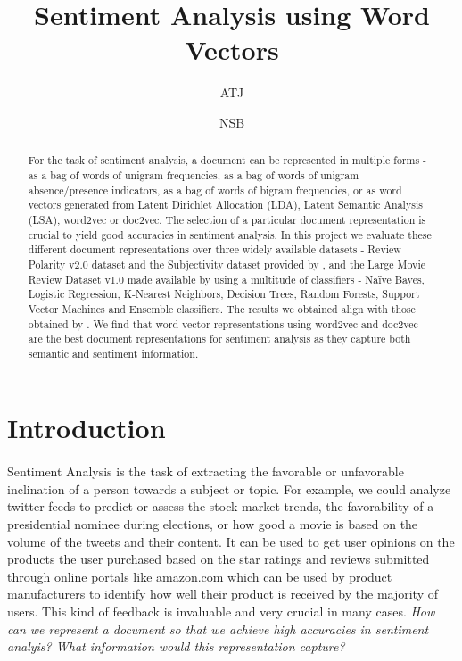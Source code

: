 \documentclass[11pt, oneside]{article}
\title{Sentiment Analysis using Word Vectors}
\author{ATJ}
\author{NSB}
\affil{University of Massachussets, Amherst}
\date{}
\begin{document}
\maketitle
{}
\newpage
{}
\begin{abstract}
For the task of sentiment analysis, a document can be represented in multiple forms - as a bag of words of unigram frequencies, as a bag of words of unigram absence/presence indicators, as a bag of words of bigram frequencies, or as word vectors generated from Latent Dirichlet Allocation (LDA), Latent Semantic Analysis (LSA), word2vec or doc2vec. The selection of a particular document representation is crucial to yield good accuracies in sentiment analysis. In this project we evaluate these different document representations over three widely available datasets - Review Polarity v2.0 dataset and the Subjectivity dataset provided by \cite{pang2004sentimental}, and the Large Movie Review Dataset v1.0 made available by \cite{maas2011learning} using a multitude of classifiers - Naïve Bayes, Logistic Regression, K-Nearest Neighbors, Decision Trees, Random Forests, Support Vector Machines and Ensemble classifiers. The results we obtained align with those obtained by \cite{maas2011learning}. We find that word vector representations using word2vec and doc2vec are the best document representations for sentiment analysis as they capture both semantic and sentiment information. 
\end{abstract}
\section{Introduction}
\paragraph{}
Sentiment Analysis is the task of extracting the favorable or unfavorable inclination of a person towards a subject or topic. For example, we could analyze twitter feeds to predict or assess the stock market trends, the favorability of a presidential nominee during elections, or how good a movie is based on the volume of the tweets and their content. It can be used to get user opinions on the products the user purchased based on the star ratings and reviews submitted through online portals like amazon.com which can be used by product manufacturers to identify how well their product is received by the majority of users. This kind of feedback is invaluable and very crucial in many cases. \textit{How can we represent a document so that we achieve high accuracies in sentiment analyis? What information would this representation capture?}
\end{document}
